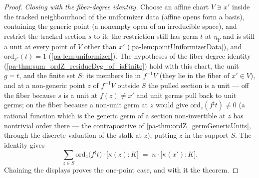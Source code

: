 \begin{proof}
  \emph{Closing with the fiber-degree identity.} Choose an affine chart
  \(V \ni x'\) inside the tracked neighbourhood of the uniformizer data (affine opens
  form a basis), containing the generic point (a nonempty open of an irreducible
  space), and restrict the tracked section \(s\) to it; the restriction still has germ
  \(t\) at \(\eta_Y\) and is still a unit at every point of \(V\) other than \(x'\)
  (\ref{pa-lem:pointUniformizerData}), and \(\mathrm{ord}_{x'}(t) = 1\)
  (\ref{pa-lem:uniformizer}). The hypotheses of the fiber-degree identity
  (\ref{pa-thm:sum_ordZ_residueDeg_of_isFinite}) hold with this chart, the unit
  \(g = t\), and the finite set \(S\): its members lie in \(f^{-1}V\) (they lie in the
  fiber of \(x' \in V\)), and at a non-generic point \(z\) of \(f^{-1}V\) outside
  \(S\) the pulled section is a unit --- off the fiber because \(s\) is a unit at
  \(f(z) \neq x'\) and unit germs pull back to unit germs; on the fiber because a
  non-unit germ at \(z\) would give \(\mathrm{ord}_z(f^{\sharp}t) \neq 0\) (a rational
  function which is the generic germ of a section non-invertible at \(z\) has
  nontrivial order there --- the contrapositive of \ref{pa-thm:ordZ_germGenericUnits},
  through the discrete valuation of the stalk at \(z\)), putting \(z\) in the support
  \(S\). The identity gives
  \[
    \sum_{z \in S} \mathrm{ord}_z\bigl(f^{\sharp}t\bigr) \cdot
      \bigl[\kappa(z) : K\bigr]
    \;=\; n \cdot \bigl[\kappa(x') : K\bigr].
  \]
  Chaining the displays proves the one-point case, and with it the theorem.
\end{proof}

